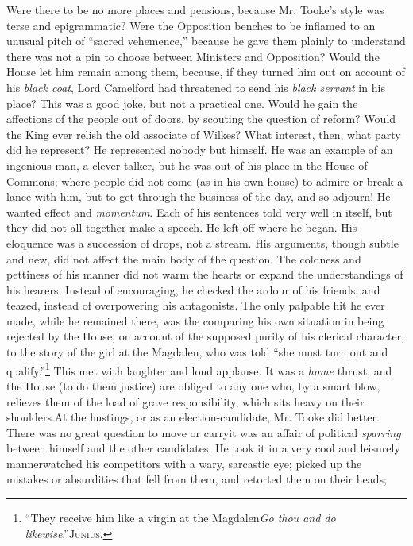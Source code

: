 Were there to be no more places and pensions, because Mr. Tooke's
style was terse and epigrammatic? Were the Opposition benches to
be inflamed to an unusual pitch of ``sacred vehemence,'' because he
gave them plainly to understand there was not a pin to choose
between Ministers and Opposition? Would the House let him remain
among them, because, if they turned him out on account of his
\emph{black coat}, Lord Camelford had threatened to send his \emph{black
servant} in his place? This was a good joke, but not a practical
one. Would he gain the affections of the people out of doors, by
scouting the question of reform? Would the King ever relish the
old associate of Wilkes? What interest, then, what party did he
represent? He represented nobody but himself. He was an example of
an ingenious man, a clever talker, but he was out of his place in
the House of Commons; where people did not come (as in his own
house) to admire or break a lance with him, but to get through the
business of the day, and so adjourn! He wanted effect and
\emph{momentum}. Each of his sentences told very well in itself, but
they did not all together make a speech. He left off where he
began. His eloquence was a succession of drops, not a stream. His
arguments, though subtle and new, did not affect the main body of
the question. The coldness and pettiness of his manner did not
warm the hearts or expand the understandings of his
hearers. Instead of encouraging, he checked the ardour of his
friends; and teazed, instead of overpowering his antagonists. The
only palpable hit he ever made, while he remained there, was the
comparing his own situation in being rejected by the House, on
account of the supposed purity of his clerical character, to the
story of the girl at the Magdalen, who was told ``she must turn out
and qualify.''\footnote{``They receive him like a virgin at the
Magdalen\textemdash \emph{Go thou and do likewise}.''\textemdash \textsc{Junius}.} This met with laughter and loud applause. It was
a \emph{home} thrust, and the House (to do them justice) are obliged to
any one who, by a smart blow, relieves them of the load of grave
responsibility, which sits heavy on their shoulders.\textemdash At the
hustings, or as an election-candidate, Mr. Tooke did better. There
was no great question to move or carry\textemdash it was an affair of
political \emph{sparring} between himself and the other candidates. He
took it in a very cool and leisurely manner\textemdash watched his
competitors with a wary, sarcastic eye; picked up the mistakes or
absurdities that fell from them, and retorted them on their heads;
